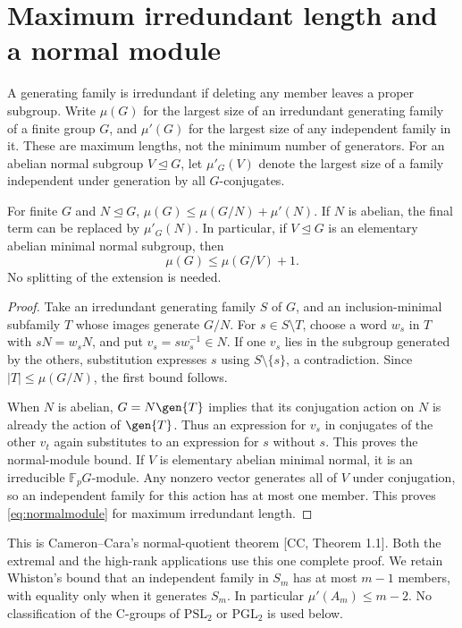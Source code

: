\section{Maximum irredundant length and a normal module}
A generating family is irredundant if deleting any member leaves a
proper subgroup. Write $\mu(G)$ for the largest size of an irredundant
generating family of a finite group $G$, and $\mu'(G)$ for the largest
size of any independent family in it. These are maximum lengths,
not the minimum number of generators. For an abelian normal subgroup
$V\unlhd G$, let $\mu'_G(V)$ denote the largest size of a family
independent under generation by all $G$-conjugates.

\begin{lemma}[UB.NormalQuotient]\label{lem:quotient}
For finite $G$ and $N\unlhd G$,
$\mu(G)\leq\mu(G/N)+\mu'(N)$. If $N$ is abelian, the final term
can be replaced by $\mu'_G(N)$. In particular, if $V\unlhd G$ is
an elementary abelian minimal normal subgroup, then
\begin{equation}\label{eq:normalmodule}
 \mu(G)\leq\mu(G/V)+1.                                      \end{equation}
No splitting of the extension is needed.
\end{lemma}
\begin{proof}
Take an irredundant generating family $S$ of $G$, and an inclusion-minimal
subfamily $T$ whose images generate $G/N$. For $s\in S\setminus T$,
choose a word $w_s$ in $T$ with $sN=w_sN$, and put
$v_s=sw_s^{-1}\in N$. If one $v_s$ lies in the subgroup generated by
the others, substitution expresses $s$ using $S\setminus\{s\}$,
a contradiction. Since $|T|\leq\mu(G/N)$, the first bound follows.

When $N$ is abelian, $G=N\gen{T}$ implies that its conjugation action
on $N$ is already the action of $\gen{T}$. Thus an expression for
$v_s$ in conjugates of the other $v_t$ again substitutes to an
expression for $s$ without $s$. This proves the normal-module bound.
If $V$ is elementary abelian minimal normal, it is an irreducible
$\mathbb F_pG$-module. Any nonzero vector generates all of $V$ under
conjugation, so an independent family for this action has at most one
member. This proves \eqref{eq:normalmodule} for maximum irredundant length.
\end{proof}

This is Cameron--Cara's normal-quotient theorem [CC, Theorem 1.1]. Both the extremal and the high-rank applications use this one complete proof. We retain Whiston's bound that an independent family in $S_m$
has at most $m-1$ members, with equality only when it generates $S_m$.
In particular $\mu'(A_m)\leq m-2$. No classification of the C-groups
of $\mathrm{PSL}_2$ or $\mathrm{PGL}_2$ is used below.

